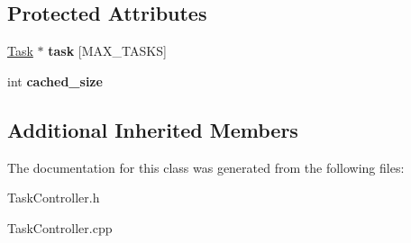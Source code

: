 \subsection*{Protected Attributes}
\begin{DoxyCompactItemize}
\item 
\hypertarget{class_task_controller_a65895eb386ce8d7afbe92fdbe261541d}{\hyperlink{class_task}{Task} $\ast$ {\bfseries task} \mbox{[}M\-A\-X\-\_\-\-T\-A\-S\-K\-S\mbox{]}}\label{class_task_controller_a65895eb386ce8d7afbe92fdbe261541d}

\item 
\hypertarget{class_task_controller_add1559b1ba4a2322b615b172903f1b26}{int {\bfseries cached\-\_\-size}}\label{class_task_controller_add1559b1ba4a2322b615b172903f1b26}

\end{DoxyCompactItemize}
\subsection*{Additional Inherited Members}


The documentation for this class was generated from the following files\-:\begin{DoxyCompactItemize}
\item 
Task\-Controller.\-h\item 
Task\-Controller.\-cpp\end{DoxyCompactItemize}
